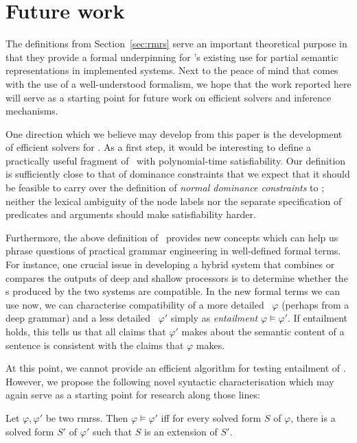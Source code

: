 \section{Future work}
\label{sec:entailment}

The definitions from Section~\ref{sec:rmrs} serve an important
theoretical purpose in that they provide a formal underpinning for \rmrs's
existing use for partial semantic representations in implemented
systems.  Next to the peace of mind that comes with the use of a
well-understood formalism, we hope that the work reported here will
serve as a starting point for future work on efficient solvers and
inference mechanisms.

One direction which we believe may develop from this paper is the
development of efficient solvers for \rmrs.  As a first step, it would
be interesting to define a practically useful fragment of \rmrs\ with
polynomial-time satisfiability.  Our definition is sufficiently close
to that of dominance constraints that we expect that it should be
feasible to carry over the definition of \emph{normal dominance
  constraints} \cite{Althaus_etal:JoA} to \rmrs; neither the lexical
ambiguity of the node labels nor the separate specification of
predicates and arguments should make satisfiability harder.

Furthermore, the above definition of \rmrs\ provides new concepts
which can help us phrase questions of practical grammar engineering in
well-defined formal terms.  For instance, one crucial issue in
developing a hybrid system that combines or compares the outputs of
deep and shallow processors is to determine whether the \rmrs s
produced by the two systems are compatible.  In the new formal terms
we can use now, we can characterise compatibility of a more detailed
\rmrs\ $\varphi$ (perhaps from a deep grammar) and a less detailed
\rmrs\ $\varphi'$ simply as \emph{entailment} $\varphi \models
\varphi'$.  If entailment holds, this tells us that all claims that
$\varphi'$ makes about the semantic content of a sentence is
consistent with the claims that $\varphi$ makes.

At this point, we cannot provide an efficient algorithm for testing
entailment of \rmrs.  However, we propose the following novel
syntactic characterisation which may again serve as a starting point
for research along those lines:


\begin{prop}\label{thm:big-one}
  Let $\varphi, \varphi'$ be two {\sc rmrs}s.  Then $\varphi \models
  \varphi'$ iff for every solved form $S$ of $\varphi$, there is a
  solved form $S'$ of $\varphi'$ such that $S$ is an extension of
  $S'$. 
\end{prop}


